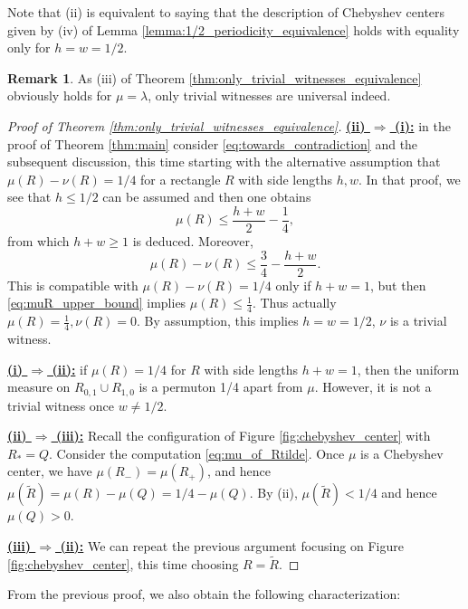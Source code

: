 \documentclass{article}
\theoremstyle{definition}
\newtheorem{remark}[theorem]{Remark}
\begin{document}
Note that (ii) is equivalent to saying that the description of Chebyshev centers given by (iv) of Lemma \ref{lemma:1/2_periodicity_equivalence} holds with equality only for $h=w=1/2$.

\begin{remark}
    As (iii) of Theorem  \ref{thm:only_trivial_witnesses_equivalence} obviously holds for $\mu=\lambda$, only trivial witnesses are universal indeed.
\end{remark}

\begin{proof}[Proof of Theorem \ref{thm:only_trivial_witnesses_equivalence}]
\underline{\bf (ii) $\Rightarrow$ (i):} in the proof of Theorem \ref{thm:main} consider \eqref{eq:towards_contradiction} and the subsequent discussion, this time starting with the alternative assumption that $\mu(R)-\nu(R)=1/4$ for a rectangle $R$ with side lengths $h,w$. In that proof, we see that $h\leq 1/2$ can be assumed and then one 
    obtains 
    \begin{equation} \label{eq:muR_upper_bound}
    \mu(R)\leq \frac{h+w}{2}-\frac{1}{4},
    \end{equation}
    from which $h+w\geq 1$ is deduced. Moreover,
    $$\mu(R)-\nu(R)\leq \frac{3}{4}-\frac{h+w}{2}.$$
    This is compatible with $\mu(R)-\nu(R)=1/4$ only if $h+w=1$, but then \eqref{eq:muR_upper_bound} implies $\mu(R)\leq \frac{1}{4}$. Thus actually $\mu(R)=\frac{1}{4}, \nu(R)=0$. By assumption, this implies $h=w=1/2$, $\nu$ is a trivial witness. 
    
\underline{\bf (i) $\Rightarrow$ (ii):} if $\mu(R)=1/4$ for $R$ with side lengths $h+w=1$, then the uniform measure on $R_{0, 1}\cup R_{1, 0}$ is a permuton 1/4 apart from $\mu$. However, it is not a trivial witness once $w\neq 1/2$.

\underline{\bf (ii) $\Rightarrow$ (iii):} Recall the configuration of Figure \ref{fig:chebyshev_center} with $R_{*}=Q$. Consider the computation \eqref{eq:mu_of_Rtilde}. Once $\mu$ is a Chebyshev center, we have $\mu(R_{-})=\mu(R_{+})$, and hence $\mu(\widetilde{R})=\mu(R)-\mu(Q)=1/4-\mu(Q)$. By (ii), $\mu(\widetilde{R})<1/4$ and hence $\mu(Q)>0$.

\underline{\bf (iii) $\Rightarrow$ (ii):} We can repeat the previous argument focusing on Figure \ref{fig:chebyshev_center}, this time choosing $R=\widetilde{R}$.
\end{proof}

From the previous proof, we also obtain the following characterization:
\end{document}
